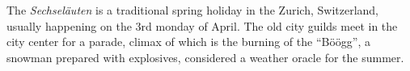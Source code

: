 The \emph{Sechsel\"auten} is a traditional spring holiday in the Zurich, Switzerland, usually happening on the 3rd monday of April.
The old city guilds meet in the city center for a parade, climax of which is the burning of the ``B\"o\"ogg'', a snowman prepared with explosives, considered a weather oracle for the summer.